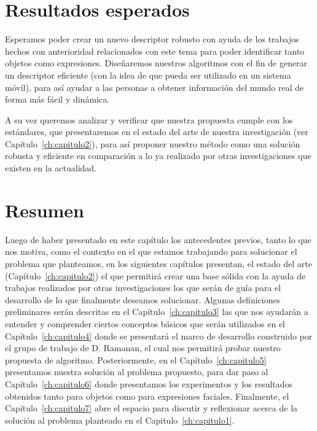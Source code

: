 \section{Resultados esperados}
Esperamos poder crear un nuevo descriptor robusto con ayuda de los trabajos hechos con anterioridad relacionados con este tema para poder identificar tanto objetos como expresiones. Diseñaremos nuestros algoritmos con el fin de generar un descriptor eficiente (con la idea de que pueda ser utilizado en un sistema móvil), para así ayudar a las personas a obtener información del mundo real de forma más fácil y dinámica.

A su vez queremos analizar y verificar que nuestra propuesta cumple con los estándares, que presentaremos en el estado del arte de nuestra investigación (ver Capítulo~\ref{ch:capitulo2}), para así proponer nuestro método como una solución robusta y eficiente en comparación a lo ya realizado por otras investigaciones que existen en la actualidad.

\section{Resumen}

Luego de haber presentado en este capítulo los antecedentes previos, tanto lo que nos motiva, como el contexto en el que estamos trabajando para solucionar el problema que planteamos, en los siguientes capítulos presentan, el estado del arte (Capítulo~\ref{ch:capitulo2}) el que permitirá crear una base sólida con la ayuda de trabajos realizados por otras investigaciones los que serán de guía para el desarrollo de lo que finalmente deseamos solucionar. Algunas definiciones preliminares serán descritas en el Capítulo~\ref{ch:capitulo3} las que nos ayudarán a entender y comprender ciertos conceptos básicos que serán utilizados en el Capítulo~\ref{ch:capitulo4} donde se presentará el marco de desarrollo construido por el grupo de trabajo de D. Ramanan, el cual nos permitirá probar nuestro propuesta de algoritmo. Posteriormente, en el Capítulo~\ref{ch:capitulo5} presentamos nuestra solución al problema propuesto, para dar paso al Capítulo~\ref{ch:capitulo6} donde presentamos los experimentos y los resultados obtenidos tanto para objetos como para expresiones faciales. Finalmente, el Capítulo~\ref{ch:capitulo7} abre el espacio para discutir y reflexionar acerca de la solución al problema planteado en el Capitulo~\ref{ch:capitulo1}.